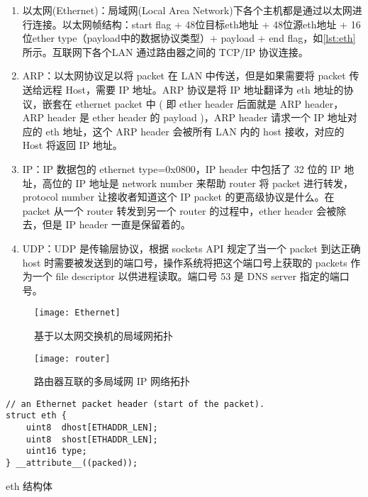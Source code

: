 \begin{enumerate}
	\item 以太网(Ethernet)：局域网(Local Area Network)下各个主机都是通过以太网进行连接。以太网帧结构：start flag + 48位目标eth地址 + 48位源eth地址 + 16位ether type（payload中的数据协议类型）+ payload + end flag，如\cref{lst:eth} 所示。互联网下各个LAN 通过路由器之间的 TCP/IP 协议连接。
	\item ARP：以太网协议足以将 packet 在 LAN 中传送，但是如果需要将 packet 传送给远程 Host，需要 IP 地址。ARP 协议是将 IP 地址翻译为 eth 地址的协议，嵌套在 ethernet packet 中 ( 即 ether header 后面就是 ARP header，ARP header 是 ether header 的 payload )，ARP header 请求一个 IP 地址对应的 eth 地址，这个 ARP header 会被所有 LAN 内的 host 接收，对应的 Host 将返回 IP 地址。
	\item IP：IP 数据包的 ethernet type=0x0800，IP header 中包括了 32 位的 IP 地址，高位的 IP 地址是 network number 来帮助 router 将 packet 进行转发，protocol number 让接收者知道这个 IP packet 的更高级协议是什么。在 packet 从一个 router 转发到另一个 router 的过程中，ether header 会被除去，但是 IP header 一直是保留着的。
	\item UDP：UDP 是传输层协议，根据 sockets API 规定了当一个 packet 到达正确 host 时需要被发送到的端口号，操作系统将把这个端口号上获取的 packets 作为一个 file descriptor 以供进程读取。端口号 53 是 DNS server 指定的端口号。
\end{enumerate}

\begin{figure}[!htb]
	\centering
	\texttt{[image: Ethernet]}
	\caption{基于以太网交换机的局域网拓扑}
	\label{fig:Ethernet}
\end{figure}

\begin{figure}[!htb]
	\centering
	\texttt{[image: router]}
	\caption{路由器互联的多局域网 IP 网络拓扑}
	\label{fig:router}
\end{figure}

\begin{listing}[!htb]
	\begin{verbatim}
// an Ethernet packet header (start of the packet).
struct eth {
    uint8  dhost[ETHADDR_LEN];
    uint8  shost[ETHADDR_LEN];
    uint16 type;
} __attribute__((packed));
	\end{verbatim}
	\caption{eth 结构体}\label{lst:eth}
\end{listing}

